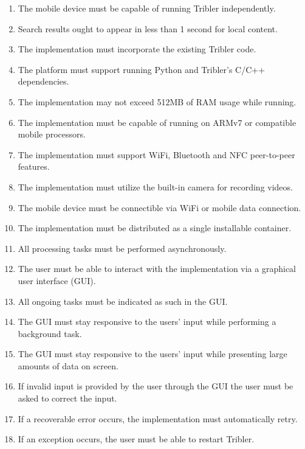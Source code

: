 \begin{enumerate}[label=B\arabic*.]
	
	\item The mobile device must be capable of running Tribler independently.
	\item Search results ought to appear in less than 1 second for local content.
	\item The implementation must incorporate the existing Tribler code.
	\item The platform must support running Python and Tribler's C/C++ dependencies.
	\item The implementation may not exceed 512MB of RAM usage while running.
	\item The implementation must be capable of running on ARMv7 or compatible mobile processors.
	\item The implementation must support WiFi, Bluetooth and NFC peer-to-peer features.
	\item The implementation must utilize the built-in camera for recording videos.
	\item The mobile device must be connectible via WiFi or mobile data connection.
	\item The implementation must be distributed as a single installable container.
	\item All processing tasks must be performed asynchronously.
	\item The user must be able to interact with the implementation via a graphical user interface (GUI).
	\item All ongoing tasks must be indicated as such in the GUI.
	\item The GUI must stay responsive to the users' input while performing a background task.
	\item The GUI must stay responsive to the users' input while presenting large amounts of data on screen.
	\item If invalid input is provided by the user through the GUI the user must be asked to correct the input.
	\item If a recoverable error occurs, the implementation must automatically retry.
	\item If an exception occurs, the user must be able to restart Tribler.

\end{enumerate}
